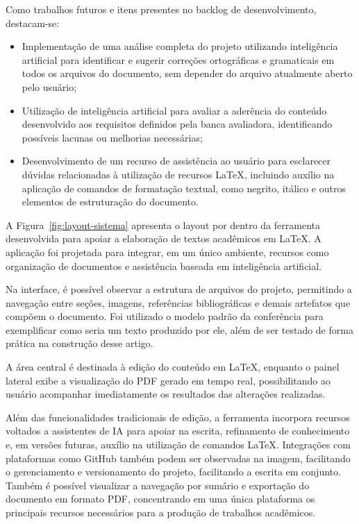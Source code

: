 Como trabalhos futuros e itens presentes no backlog de desenvolvimento, destacam-se:

\begin{itemize}
    \item Implementação de uma análise completa do projeto utilizando inteligência artificial para identificar e sugerir correções ortográficas e gramaticais em todos os arquivos do documento, sem depender do arquivo atualmente aberto pelo usuário;

    \item Utilização de inteligência artificial para avaliar a aderência do conteúdo desenvolvido aos requisitos definidos pela banca avaliadora, identificando possíveis lacunas ou melhorias necessárias;

    \item Desenvolvimento de um recurso de assistência ao usuário para esclarecer dúvidas relacionadas à utilização de recursos \LaTeX, incluindo auxílio na aplicação de comandos de formatação textual, como negrito, itálico e outros elementos de estruturação do documento.
\end{itemize}

A Figura~\ref{fig:layout-sistema} apresenta o layout por dentro da ferramenta desenvolvida para apoiar a elaboração de textos acadêmicos em \LaTeX. A aplicação foi projetada para integrar, em um único ambiente, recursos como organização de documentos e assistência baseada em inteligência artificial.

Na interface, é possível observar a estrutura de arquivos do projeto, permitindo a navegação entre seções, imagens, referências bibliográficas e demais artefatos que compõem o documento. Foi utilizado o modelo padrão da conferência para exemplificar como seria um texto produzido por ele, além de ser testado de forma prática na construção desse artigo. 

A área central é destinada à edição do conteúdo em \LaTeX, enquanto o painel lateral exibe a visualização do PDF gerado em tempo real, possibilitando ao usuário acompanhar imediatamente os resultados das alterações realizadas.

Além das funcionalidades tradicionais de edição, a ferramenta incorpora recursos voltados a assistentes de IA para apoiar na escrita, refinamento de conhecimento e, em versões futuras, auxílio na utilização de comandos \LaTeX. Integrações com plataformas como GitHub também podem ser observadas na imagem, facilitando o gerenciamento e versionamento do projeto, facilitando a escrita em conjunto. Também é possível visualizar a navegação por sumário e exportação do documento em formato PDF, concentrando em uma única plataforma os principais recursos necessários para a produção de trabalhos acadêmicos.


